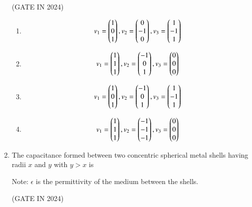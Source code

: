 \documentclass[journal,12pt,onecolumn]{IEEEtran}
\theoremstyle{remark}
\begin{document}
\begin{enumerate}
    \hfill{(GATE IN 2024)}
    \begin{enumerate}
        \item 
        \begin{align*}
        v_1 = \begin{pmatrix}1 \\ 0 \\ 1\end{pmatrix}, v_2 = \begin{pmatrix}0 \\ -1 \\ 0\end{pmatrix}, v_3 = \begin{pmatrix}1 \\ -1 \\ 1\end{pmatrix}
        \end{align*}
        \item 
        \begin{align*}
        v_1 = \begin{pmatrix}1 \\ 1 \\ 1\end{pmatrix}, v_2 = \begin{pmatrix}-1 \\ 0 \\ 1\end{pmatrix}, v_3 = \begin{pmatrix}0 \\ 0 \\ 0\end{pmatrix}
        \end{align*}
        \item
        \begin{align*}
        v_1 = \begin{pmatrix}1 \\ 0 \\ 1\end{pmatrix}, v_2 = \begin{pmatrix}-1 \\ 0 \\ 1\end{pmatrix}, v_3 = \begin{pmatrix}1 \\ -1 \\ 1\end{pmatrix}
        \end{align*}
        \item
        \begin{align*}
        v_1 = \begin{pmatrix}1 \\ 1 \\ 1\end{pmatrix}, v_2 = \begin{pmatrix}-1 \\ -1 \\ -1\end{pmatrix}, v_3 = \begin{pmatrix}0 \\ 0 \\ 0\end{pmatrix}
        \end{align*}
    \end{enumerate}
    
    \item The capacitance formed between two concentric spherical metal shells having radii $x$ and $y$ with $y > x$ is
    
    Note: $\epsilon$ is the permittivity of the medium between the shells.

    \hfill{(GATE IN 2024)}
    \begin{enumerate}
    \end{enumerate}
    

\end{enumerate}
\end{document}

